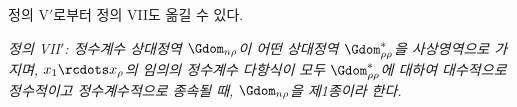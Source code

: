 
정의 V$'$로부터 정의 VII도 옮길 수 있다.

\emph{정의 VII$'$: 정수계수 상대정역 $\Gdom_{n\rho}$이 어떤 상대정역 $\Gdom^*_{\rho\rho}$을 사상영역으로 가지며, $x_1\rcdots x_\rho$의 임의의 정수계수 다항식이 모두 $\Gdom^*_{\rho\rho}$에 대하여 대수적으로 정수적이고 정수계수적으로 종속될 때, $\Gdom_{n\rho}$을 제1종이라 한다.}
